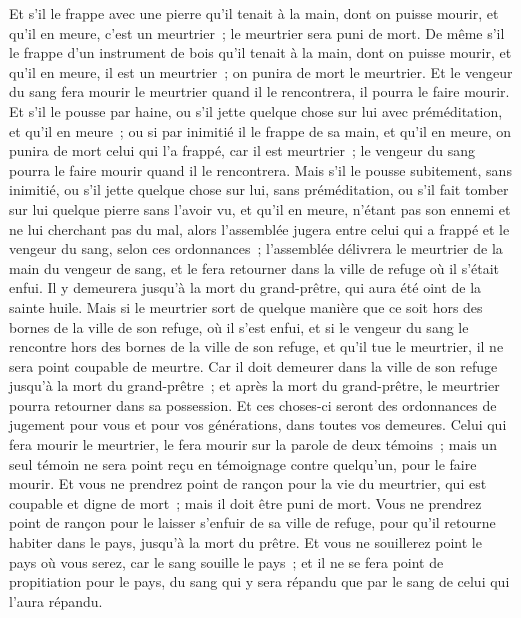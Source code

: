 \begin{multicols}{2}
Et s'il le frappe avec une pierre qu'il tenait à la main, dont on puisse mourir, et qu'il en meure, c'est un meurtrier~; le meurtrier sera puni de mort.
De même s'il le frappe d'un instrument de bois qu'il tenait à la main, dont on puisse mourir, et qu'il en meure, il est un meurtrier~; on punira de mort le meurtrier.
Et le vengeur du sang fera mourir le meurtrier quand il le rencontrera, il pourra le faire mourir.
Et s'il le pousse par haine, ou s'il jette quelque chose sur lui avec préméditation, et qu'il en meure~;
ou si par inimitié il le frappe de sa main, et qu'il en meure, on punira de mort celui qui l'a frappé, car il est meurtrier~; le vengeur du sang pourra le faire mourir quand il le rencontrera.
Mais s'il le pousse subitement, sans inimitié, ou s'il jette quelque chose sur lui, sans préméditation,
ou s'il fait tomber sur lui quelque pierre sans l'avoir vu, et qu'il en meure, n'étant pas son ennemi et ne lui cherchant pas du mal,
alors l'assemblée jugera entre celui qui a frappé et le vengeur du sang, selon ces ordonnances~;
l'assemblée délivrera le meurtrier de la main du vengeur de sang, et le fera retourner dans la ville de refuge où il s'était enfui. Il y demeurera jusqu'à la mort du grand-prêtre, qui aura été oint de la sainte huile.
Mais si le meurtrier sort de quelque manière que ce soit hors des bornes de la ville de son refuge, où il s'est enfui,
et si le vengeur du sang le rencontre hors des bornes de la ville de son refuge, et qu'il tue le meurtrier, il ne sera point coupable de meurtre.
Car il doit demeurer dans la ville de son refuge jusqu'à la mort du grand-prêtre~; et après la mort du grand-prêtre, le meurtrier pourra retourner dans sa possession.
Et ces choses-ci seront des ordonnances de jugement pour vous et pour vos générations, dans toutes vos demeures.
Celui qui fera mourir le meurtrier, le fera mourir sur la parole de deux témoins~; mais un seul témoin ne sera point reçu en témoignage contre quelqu'un, pour le faire mourir.
Et vous ne prendrez point de rançon pour la vie du meurtrier, qui est coupable et digne de mort~; mais il doit être puni de mort.
Vous ne prendrez point de rançon pour le laisser s'enfuir de sa ville de refuge, pour qu'il retourne habiter dans le pays, jusqu'à la mort du prêtre.
Et vous ne souillerez point le pays où vous serez, car le sang souille le pays~; et il ne se fera point de propitiation pour le pays, du sang qui y sera répandu que par le sang de celui qui l'aura répandu.

\end{multicols}
